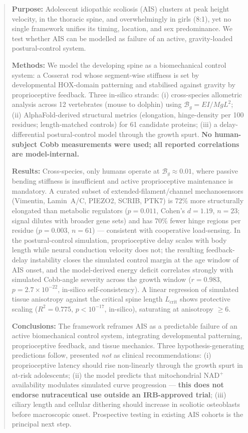 \begin{abstract}
\noindent\textbf{Purpose:} Adolescent idiopathic scoliosis (AIS) clusters at peak height velocity, in the thoracic spine, and overwhelmingly in girls (8:1), yet no single framework unifies its timing, location, and sex predominance. We test whether AIS can be modelled as failure of an active, gravity-loaded postural-control system.

\noindent\textbf{Methods:} We model the developing spine as a biomechanical control system: a Cosserat rod whose segment-wise stiffness is set by developmental HOX-domain patterning and stabilised against gravity by proprioceptive feedback. Three in-silico strands: (i) cross-species allometric analysis across 12 vertebrates (mouse to dolphin) using $\mathcal{B}_g = EI/MgL^2$; (ii) AlphaFold-derived structural metrics (elongation, hinge-density per 100 residues; length-matched controls) for 61 candidate proteins; (iii) a delay-differential postural-control model through the growth spurt. \textbf{No human-subject Cobb measurements were used; all reported correlations are model-internal.}

\noindent\textbf{Results:} Cross-species, only humans operate at $\mathcal{B}_g \approx 0.01$, where passive bending stiffness is insufficient and active proprioceptive maintenance is mandatory. A curated subset of extended-filament/channel mechanosensors (Vimentin, Lamin~A/C, PIEZO2, SCRIB, PTK7) is 72\% more structurally elongated than metabolic regulators ($p=0.011$, Cohen's $d=1.19$, $n=23$; signal dilutes with broader gene sets) and has 70\% fewer hinge regions per residue ($p=0.003$, $n=61$) --- consistent with cooperative load-sensing. In the postural-control simulation, proprioceptive delay scales with body length while neural conduction velocity does not; the resulting feedback-delay instability closes the simulated control margin at the age window of AIS onset, and the model-derived energy deficit correlates strongly with simulated Cobb-angle severity across the growth window ($r=0.983$, $p=2.7\times 10^{-22}$, in-silico self-consistency). A linear regression of simulated tissue anisotropy against the critical spine length $L_{\mathrm{crit}}$ shows protective scaling ($R^2=0.775$, $p<10^{-17}$, in-silico), saturating at anisotropy $\geq 6$.

\noindent\textbf{Conclusions:} The framework reframes AIS as a predictable failure of an active biomechanical control system, integrating developmental patterning, proprioceptive feedback, and tissue mechanics. Three hypothesis-generating predictions follow, presented \emph{not} as clinical recommendations: (i) proprioceptive latency should rise non-linearly through the growth spurt in at-risk adolescents; (ii) the model predicts that mitochondrial NAD$^+$ availability modulates simulated curve progression --- \textbf{this does not endorse nutraceutical use outside an IRB-approved trial}; (iii) ciliary length and cellular dithering should increase in scoliotic osteoblasts before macroscopic onset. Prospective testing in existing AIS cohorts is the principal next step.
\end{abstract}
